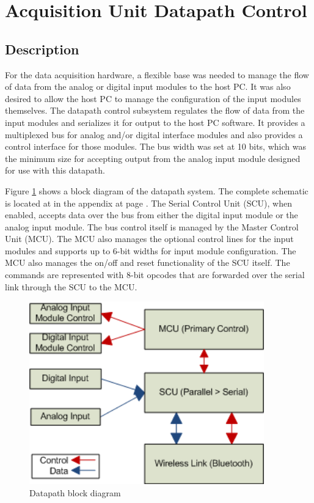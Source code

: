 \section[Datapath Control]{Acquisition Unit Datapath Control}
\subsection{Description}
For the data acquisition hardware, a flexible base was needed to manage the 
flow of data from the analog or digital input modules to the host PC. It was 
also desired to allow the host PC to manage the configuration of the input 
modules themselves. The datapath control subsystem regulates the flow of data 
from the input modules and serializes it for output to 
the host PC software. It provides a multiplexed bus for analog and/or 
digital interface modules and also provides a control interface for those 
modules. The bus width was set at 10 bits, which was the minimum size for
 accepting output from the analog input module designed for use with this 
datapath.

Figure \ref{fig:datapath diagram} shows a block diagram of the datapath system. The complete schematic is located at in the appendix at page \pageref{sch:datapath}. 
The Serial Control Unit (SCU), when enabled, accepts data over the bus from 
either the digital input module or the analog input module. The bus control 
itself is managed by the Master Control Unit (MCU). The MCU also 
manages the optional control lines for the input modules and supports up to 
6-bit widths for input module configuration. The MCU also manages the on/off 
and reset functionality of the SCU itself. The commands are represented with 8-bit opcodes that are forwarded over the serial link through the SCU to the MCU. 

\begin{figure}[hbp]
\caption{Datapath block diagram}
\begin{center}
\includegraphics[width=4in]{../drawings/datapath_block.png}
\end{center}
\label{fig:datapath diagram}
\end{figure}
